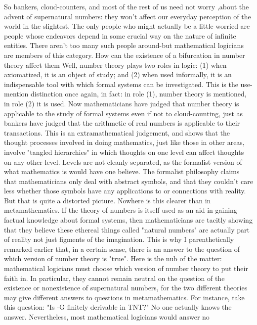 So bankers, cloud-counters, and most of the rest of us need not worry ,about the advent of
supernatural numbers: they won't affect our everyday perception of the world in the
slightest. The only people who might actually be a little worried are people whose
endeavors depend in some crucial way on the nature of infinite entities. There aren't too
many such people around-but mathematical logicians are members of this category. How
can the existence of a bifurcation in number theory affect them Well, number theory
plays two roles in logic: (1) when axiomatized, it is an object of study; and (2) when used
informally, it is an indispensable tool with which formal systems can be investigated.
This is the use-mention distinction once again, in fact: in role (1), number theory is
mentioned, in role (2) it is used.
        Now mathematicians have judged that number theory is applicable to the study of
formal systems even if not to cloud-counting, just as bankers have judged that the
arithmetic of real numbers is applicable to their transactions. This is an
extramathematical judgement, and shows that the thought processes involved in doing
mathematics, just like those in other areas, involve "tangled hierarchies" in which
thoughts on one level can affect thoughts on any other level. Levels are not cleanly
separated, as the formalist version of what mathematics is would have one believe.
        The formalist philosophy claims that mathematicians only deal with abstract
symbols, and that they couldn't care less whether those symbols have any applications to
or connections with reality. But that is quite a distorted picture. Nowhere is this clearer
than in metamathematics. If the theory of numbers is itself used as an aid in gaining
factual knowledge about formal systems, then mathematicians are tacitly showing that
they believe these ethereal things called "natural numbers" are actually part of reality not
just figments of the imagination. This is why I parenthetically remarked earlier that, in a
certain sense, there is an answer to the question of which version of number theory is
"true". Here is the nub of the matter: mathematical logicians must choose which version
of number theory to put their faith in. In particular, they cannot remain neutral on the
question of the existence or nonexistence of supernatural numbers, for the two different
theories may give different answers to questions in metamathematics.
        For instance, take this question: "Is -G finitely derivable in TNT?" No one
actually knows the answer. Nevertheless, most mathematical logicians would answer no
